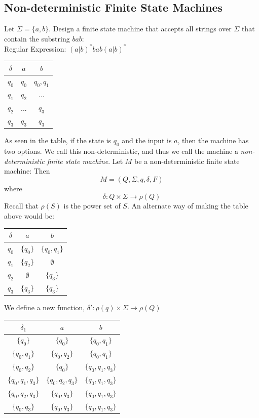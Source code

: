 \documentclass{scrartcl}
\begin{document}
\subsection{Non-deterministic Finite State Machines}
Let $\Sigma=\{a,b\}$. Design a finite state machine that accepts all strings over $\Sigma$ that contain the substring $bab$:\\

Regular Expression: $(a|b)^*bab(a|b)^*$
\begin{center}
\begin{tabular} {|c|c c|}
\hline
$\delta$&$a$&$b$\\
\hline
$q_0$&$q_0$&$q_0,q_1$\\
$q_1$&$q_2$&...\\
$q_2$&...&$q_3$\\
$q_3$&$q_3$&$q_3$\\
\hline
\end{tabular}
\end{center}

As seen in the table, if the state is $q_0$ and the input is $a$, then the machine has two options. We call this non-deterministic, and thus we call the machine a \emph{non-deterministic finite state machine}. Let $M$ be a non-deterministic finite state machine: Then $$M=(Q,\Sigma,q,\delta,F)$$ where $$\delta : Q \times \Sigma \rightarrow \rho(Q)$$ Recall that $\rho(S)$ is the power set of $S$. An alternate way of making the table above would be:

\begin{center}
\begin{tabular} {|c|c c|}
\hline
$\delta$&$a$&$b$\\
\hline
$q_0$&$\{q_0\}$&$\{q_0,q_1\}$\\
$q_1$&$\{q_2\}$&$\emptyset$\\
$q_2$&$\emptyset$&$\{q_3\}$\\
$q_3$&$\{q_3\}$&$\{q_3\}$\\
\hline
\end{tabular}
\end{center}

We define a new function, $\delta' : \rho(q)\times\Sigma\rightarrow\rho(Q)$

\begin{center}
\begin{tabular} {|c|c c|}
\hline
$\delta_1$&$a$&$b$\\
\hline
$\{q_0\}$&$\{q_0\}$&$\{q_0,q_1\}$\\
$\{q_0,q_1\}$&$\{q_0,q_2\}$&$\{q_0,q_1\}$\\
$\{q_0,q_2\}$&$\{q_0\}$&$\{q_0,q_1,q_3\}$\\
$\{q_0,q_1,q_3\}$&$\{q_0,q_2,q_3\}$&$\{q_0,q_1,q_3\}$\\
$\{q_0,q_2,q_3\}$&$\{q_0,q_3\}$&$\{q_0,q_1,q_3\}$\\
$\{q_0,q_3\}$&$\{q_0,q_3\}$&$\{q_0,q_1,q_3\}$\\
\hline
\end{tabular}
\end{center}
\end{document}
